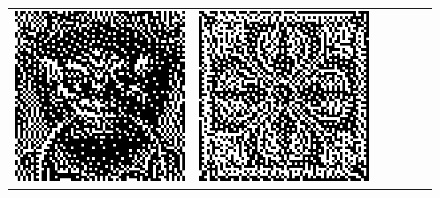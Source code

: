 \begin{figure}
\begin{tabular}{c c c c c c}
		\includegraphics[width=\tilewidth,interpolate=false]{media/chp2/associative_memory/binam/00_02_out_scaled_crushed.png}&%
		\includegraphics[width=\tilewidth,interpolate=false]{media/chp2/associative_memory/binam/01_00_orig_scaled_crushed.png}&%

\end{tabular}
\end{figure}
